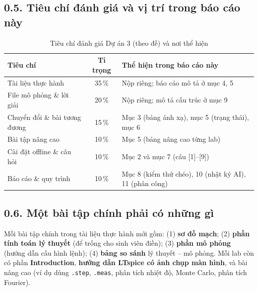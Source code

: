 \documentclass[12pt,a4paper]{article}
\newcommand{\hc}[1]{\cellcolor{navy}\color{white}\sffamily\bfseries\small #1}
\begin{document}
\subsection*{0.5. Tiêu chí đánh giá và vị trí trong báo cáo này}
\begin{table}[H]\centering\small
\caption{Tiêu chí đánh giá Dự án 3 (theo đề) và nơi thể hiện}
\renewcommand{\arraystretch}{1.25}
\begin{tabular}{|p{4.2cm}|c|p{8.2cm}|}
\hline
\hc{Tiêu chí} & \hc{Tỉ trọng} & \hc{Thể hiện trong báo cáo này}\\ \hline
Tài liệu thực hành & 35\,\% & Nộp riêng; báo cáo mô tả ở mục 4, 5\\ \hline
File mô phỏng \& lời giải & 20\,\% & Nộp riêng; mô tả cấu trúc ở mục 9\\ \hline
Chuyển đổi \& bài tương đương & 15\,\% & Mục 3 (bảng ánh xạ), mục 5 (trạng thái), mục 6\\ \hline
Bài tập nâng cao & 10\,\% & Mục 5 (bảng nâng cao từng lab)\\ \hline
Cài đặt offline \& câu hỏi & 10\,\% & Mục 2 và mục 7 (câu [1]--[9])\\ \hline
Báo cáo \& quy trình & 10\,\% & Mục 8 (kiểm thử chéo), 10 (nhật ký AI), 11 (phân công)\\ \hline
\end{tabular}
\end{table}

\subsection*{0.6. Một bài tập chính phải có những gì}
Mỗi bài tập chính trong tài liệu thực hành mới gồm: (1) \textbf{sơ đồ mạch}; (2) \textbf{phần tính toán lý thuyết} (để trống cho sinh viên điền); (3) \textbf{phần mô phỏng} (hướng dẫn cấu hình lệnh); (4) \textbf{bảng so sánh} lý thuyết -- mô phỏng. Mỗi lab còn có phần \textbf{Introduction}, \textbf{hướng dẫn LTspice có ảnh chụp màn hình}, và bài nâng cao (ví dụ dùng \texttt{.step}, \texttt{.meas}, phân tích nhiệt độ, Monte Carlo, phân tích Fourier).

\clearpage
\fi

\end{document}
